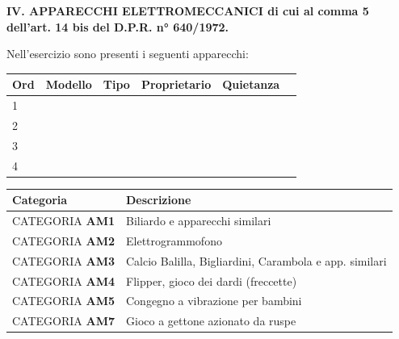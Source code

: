\documentclass[12pt]{article}
\newcommand\annoIscrizione{$annoIscrizione}
\begin{document}
\begin{center}
    \textbf{IV. APPARECCHI ELETTROMECCANICI di cui al comma 5 dell’art. 14 bis del D.P.R. n° 640/1972.}
\end{center}

Nell'esercizio sono presenti i seguenti apparecchi:
\begin{table}[h]
    \centering
    \begin{tabular}{|p{2.5cm}|p{2.5cm}|p{2.5cm}|p{2.5cm}|p{2.5cm}|p{2.5cm}|}
        \hline
        Ord & Modello & Tipo & Proprietario & Quietanza \\
        \hline
        1 \newline &  &  &  & \\
        \hline
        2 \newline &  &  &  & \\
        \hline
        3 \newline &  &  &  & \\
        \hline
        4 \newline &  &  &  & \\
        \hline
    \end{tabular}
\end{table}

\begin{table}[h]
    \centering
    \begin{tabular}{|l|l|}
        \hline
         Categoria & Descrizione \\
        \hline
         CATEGORIA \textbf{AM1} & Biliardo e apparecchi similari\\
        \hline
         CATEGORIA \textbf{AM2} & Elettrogrammofono\\
        \hline
         CATEGORIA \textbf{AM3} & Calcio Balilla, Bigliardini, Carambola e app. similari\\
        \hline
         CATEGORIA \textbf{AM4} & Flipper, gioco dei dardi (freccette)\\
        \hline
         CATEGORIA \textbf{AM5} & Congegno a vibrazione per bambini\\
        \hline
         CATEGORIA \textbf{AM7} & Gioco a gettone azionato da ruspe\\
        \hline
    \end{tabular}
\end{table}

\end{document}
